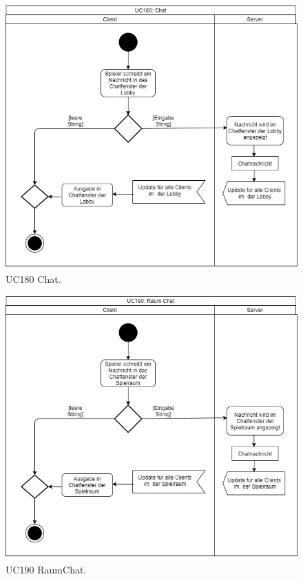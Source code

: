 \begin{figure}[h]
	\centering
	\includegraphics[width=\textwidth]{ad/UC180_Chat .jpg}
	\caption{UC180 Chat.}
\end{figure}

\begin{figure}[h]
	\centering
	\includegraphics[width=\textwidth]{ad/_UC190_RaumChat.jpg}
	\caption{UC190 RaumChat.}
\end{figure}


